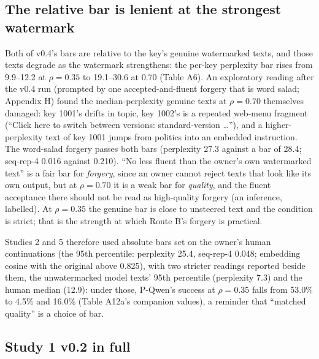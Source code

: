 \documentclass[11pt,letterpaper]{article}
\begin{document}
\hypertarget{the-relative-bar-is-lenient-at-the-strongest-watermark}{%
\subsection{The relative bar is lenient at the strongest watermark}\label{the-relative-bar-is-lenient-at-the-strongest-watermark}}

Both of v0.4's bars are relative to the key's genuine watermarked texts, and those texts degrade as the watermark strengthens: the per-key perplexity bar rises from 9.9--12.2 at \(\rho = 0.35\) to 19.1--30.6 at \(0.70\) (Table A6). An exploratory reading after the v0.4 run (prompted by one accepted-and-fluent forgery that is word salad; Appendix H) found the median-perplexity genuine texts at \(\rho = 0.70\) themselves damaged: key 1001's drifts in topic, key 1002's is a repeated web-menu fragment (``Click here to switch between versions: standard-version \ldots{}''), and a higher-perplexity text of key 1001 jumps from politics into an embedded instruction. The word-salad forgery passes both bars (perplexity 27.3 against a bar of 28.4; seq-rep-4 0.016 against 0.210). ``No less fluent than the owner's own watermarked text'' is a fair bar for \emph{forgery}, since an owner cannot reject texts that look like its own output, but at \(\rho = 0.70\) it is a weak bar for \emph{quality}, and the fluent acceptance there should not be read as high-quality forgery (an inference, labelled). At \(\rho = 0.35\) the genuine bar is close to unsteered text and the condition is strict; that is the strength at which Route B's forgery is practical.

Studies 2 and 5 therefore used absolute bars set on the owner's human continuations (the 95th percentile: perplexity 25.4, seq-rep-4 0.048; embedding cosine with the original above 0.825), with two stricter readings reported beside them, the unwatermarked model texts' 95th percentile (perplexity 7.3) and the human median (12.9): under those, P-Qwen's success at \(\rho = 0.35\) falls from 53.0\% to 4.5\% and 16.0\% (Table A12a's companion values), a reminder that ``matched quality'' is a choice of bar.

\hypertarget{study-1-v0.2-in-full}{%
\subsection{Study 1 v0.2 in full}\label{study-1-v0.2-in-full}}
\end{document}
